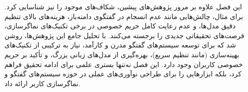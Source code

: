 این فصل علاوه بر مرور پژوهش‌های پیشین، شکاف‌های موجود را نیز شناسایی کرد. برای مثال، چالش‌هایی مانند عدم انسجام در گفتگوی دامنه‌باز، هزینه‌های بالای تنظیم دقیق مدل‌ها، و عدم رعایت کامل حریم خصوصی در برخی تکنیک‌های نماگر‌سازی، فرصت‌های تحقیقاتی جدیدی را برجسته می‌کنند.
\newline
با تحلیل جامع این پژوهش‌ها، روشن شد که برای توسعه سیستم‌های گفتگو مدرن و کارآمد، نیاز به ترکیبی از تکنیک‌های بهینه‌سازی (مانند تنظیم سریع)، بهره‌گیری از مدل‌های زبانی بزرگ، و تأکید بر حریم خصوصی کاربران وجود دارد. این فصل نه‌تنها بستری علمی برای ادامه تحقیق فراهم کرد، بلکه ابزارهایی را برای طراحی نوآوری‌های عملی در حوزه سیستم‌های گفتگو و نماگر‌سازی کاربر ارائه داد.